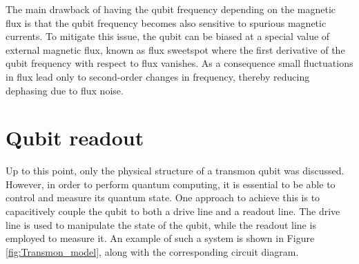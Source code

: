 The main drawback of having the qubit frequency depending on the magnetic flux is that the qubit frequency becomes also sensitive to spurious magnetic currents.
To mitigate this issue, the qubit can be biased at a special value of external magnetic flux, known as flux sweetspot where the first derivative of the qubit frequency with respect to flux vanishes.
As a consequence small fluctuations in flux lead only to second-order changes in frequency, thereby reducing dephasing due to flux noise.

\section{Qubit readout}\label{sec:cQED}
Up to this point, only the physical structure of a transmon qubit was discussed. 
However, in order to perform quantum computing, it is essential to be able to control and measure its quantum state.
One approach to achieve this is to capacitively couple the qubit to both a drive line and a readout line. 
The drive line is used to manipulate the state of the qubit, while the readout line is employed to measure it.
An example of such a system is shown in Figure \ref{fig:Transmon_model}, along with the corresponding circuit diagram.

